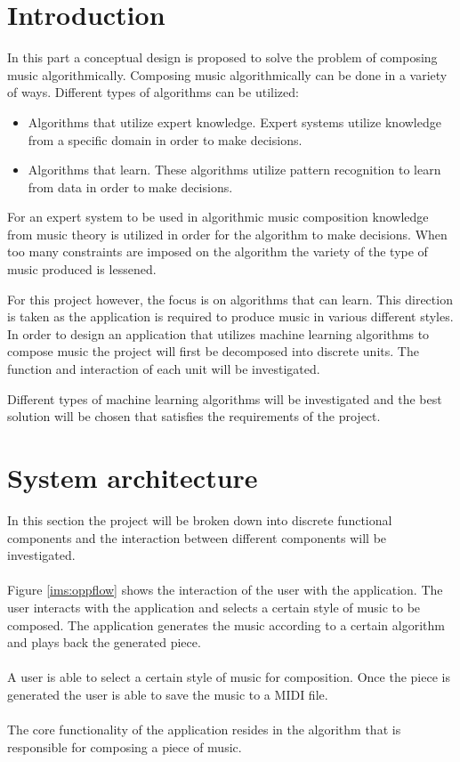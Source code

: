 

\chapter{Introduction}
In this part a conceptual design is proposed to solve the problem of composing music algorithmically.
Composing music algorithmically can be done in a variety of ways. Different types of algorithms can be utilized:
\begin{itemize}
\item Algorithms that utilize expert knowledge. Expert systems utilize knowledge from a specific domain in order to make decisions.
\item Algorithms that learn. These algorithms utilize pattern recognition to learn from data in order to make decisions.
\end{itemize}
For an expert system to be used in algorithmic music composition knowledge from music theory is utilized in order for the algorithm to make decisions. When too many constraints are imposed on the algorithm the variety of the type of music produced is lessened.

For this project however, the focus is on algorithms that can learn. This direction is taken as the application is required to produce music in various different styles. In order to design an application that utilizes machine learning algorithms to compose music the project will first be decomposed into discrete units. The function and interaction of each unit will be investigated. 

Different types of machine learning algorithms will be investigated and the best solution will be chosen that satisfies the requirements of the project.

\chapter{System architecture}
In this section the project will be broken down into discrete functional components and the interaction between different components will be investigated.
\\\\
Figure \ref{ims:oppflow} shows the interaction of the user with the application. 
The user interacts with the application and selects a certain style of music to be composed. The application generates the music according to a certain algorithm and plays back the generated piece. 
\\\\
A user is able to select a certain style of music for composition. Once the piece is generated the user is able to save the music to a \ac{MIDI} file.
\\\\
The core functionality of the application resides in the algorithm that is responsible for composing a piece of music.

